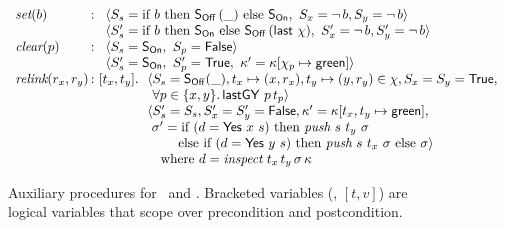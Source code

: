 {\begin{figure}[t]
\hrulefill
%
\small
\[
\begin{array}{l@{\, :\ }l}
  \aux{set}(b) &
  \begin{array}[t]{l}
        \langle \sss = \textrm{if}\ b\ \textrm{then}\ \sOff\,(\_) \ 
        \textrm{else}\ \sOn,\ \sx = \neg\, b, \sy = \neg\, b \rangle\\
        \langle \sss' = \textrm{if}\ b\ \textrm{then}\ \sOn\ %
        \textrm{else}\ \sOff\,(\mathsf{last}\ \hist),\
         \sx' = \neg\, b, \sy' = \neg\, b \rangle
\end{array}\\[2.5pt] 
   \aux{clear}(p) &
  \begin{array}[t]{l}
   \langle\sss = \sOn,\ \spp = \FF \rangle\\
   \langle\sss' = \sOn,\ \spp' = \TT,\
     \CP = \C[\histp \hpts \mathsf{green}] \rangle
  \end{array}\\[2.5pt]
   \aux{relink}(r_x, r_y) & [t_x, t_y]\ldot
    \begin{array}[t]{l}
    \langle\sss = \sOff(\_), %
      t_x \hpts (x, r_x), t_y \hpts (y, r_y) \in \hist, \sx = \sy = \TT, \\
     \hphantom{\langle} \forall p \in \{x,y\}\ldot \lgVy\ p\, t_p \rangle\\
        \langle\sss' = \sss, \sx'= \sy'=\FF,%
        \CP = \C[t_x, t_y \hpts \mathsf{green}],\\
      \ \ordlist' = \textrm{if}\ (d = \mathsf{Yes}\ x\ s)\
                \textrm{then}\ \aux{push}\ s\ t_y\ \ordlist\\
                 \phantom{\ \ordlist =\ } \textrm{else\ if}\
                 (d = \mathsf{Yes}\ y\ s)\ \textrm{then}\
                 \aux{push}\ s\ t_x\ \ordlist\ \textrm{else}\ \ordlist\rangle\\
  \quad \mbox{where $d = \aux{inspect}\ t_x\, t_y\, \ordlist\, \C$}
  \end{array}
\end{array}
\]
\caption{\label{fig:auxcode} Auxiliary procedures for
\jywrite~and 
  \jyscan. Bracketed variables (\eg, $[t, v]$) are logical variables
  that scope over precondition and postcondition.}
\end{figure}
}

